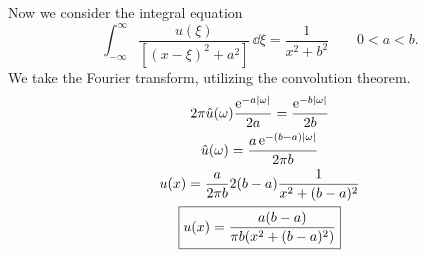 {\begin{Solution}
  Now we consider the integral equation
  \[
  \int_{-\infty}^{\infty} \frac{u(\xi)}{\left[(x-\xi)^2 + a^2\right]} \,\dd \xi
  = \frac{1}{x^2 + b^2} \qquad 0<a<b.
  \]
  We take the Fourier transform, utilizing the convolution theorem.
  \begin{gather*}
    2 \pi \hat{u}(\omega) \frac{ \mathop{\mathrm{e}}\nolimits^{- a |\omega|} }{2 a} 
    = \frac{ \mathop{\mathrm{e}}\nolimits^{- b |\omega|} }{2 b} \\
    \hat{u}(\omega) = \frac{a \mathop{\mathrm{e}}\nolimits^{- (b-a) |\omega|}}{2 \pi b} \\
    u(x) = \frac{a}{2 \pi b} 2 (b - a) \frac{1}{x^2 + (b-a)^2} \\
    \boxed{
      u(x) = \frac{ a (b-a) }{\pi b (x^2 + (b-a)^2)}
      }
  \end{gather*}
\end{Solution}







}
